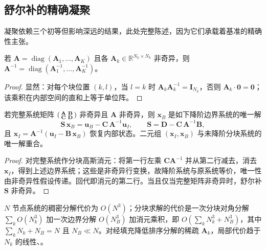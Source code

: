 \subsection{舒尔补的精确凝聚}
\label{sub:schur}

凝聚依赖三个初等但影响深远的结果，此处完整陈述，因为它们承载着基准的精确性主张。

\begin{lemma}[分块对角逆]
\label{lem:blockdiag}
若 $\mathbf{A} = \operatorname{diag}(\mathbf{A}_1, \dots, \mathbf{A}_K)$ 且各 $\mathbf{A}_k \in \mathbb{R}^{N_k \times N_k}$ 非奇异，则 $\mathbf{A}^{-1} = \operatorname{diag}(\mathbf{A}_1^{-1}, \dots, \mathbf{A}_K^{-1})$。
\end{lemma}
\begin{proof}
显然：对每个块位置 $(k, l)$，当 $l = k$ 时 $\mathbf{A}_k \mathbf{A}_k^{-1} = \mathbf{I}_{N_k}$，否则 $\mathbf{A}_k \cdot \mathbf{0} = \mathbf{0}$；该乘积在内部空间的直和上等于单位阵。
\end{proof}

\begin{theorem}[舒尔凝聚的精确性]
\label{thm:schur}
若完整系统矩阵 $\begin{psmallmatrix} \mathbf{A} & \mathbf{B} \\ \mathbf{C} & \mathbf{D} \end{psmallmatrix}$ 非奇异且 $\mathbf{A}$ 非奇异，则 $\mathbf{x}_B$ 是如下降阶边界系统的唯一解
\begin{equation}
\mathbf{S}\, \mathbf{x}_B = \mathbf{u}_B - \mathbf{C}\, \mathbf{A}^{-1} \mathbf{u}_I, \qquad \mathbf{S} = \mathbf{D} - \mathbf{C}\, \mathbf{A}^{-1} \mathbf{B},
\label{eq:schur}
\end{equation}
且 $\mathbf{x}_I = \mathbf{A}^{-1}(\mathbf{u}_I - \mathbf{B}\, \mathbf{x}_B)$ 恢复内部状态。二元组 $(\mathbf{x}_I, \mathbf{x}_B)$ 与未降阶分块系统的唯一解重合。
\end{theorem}
\begin{proof}
对完整系统作分块高斯消元：将第一行左乘 $\mathbf{C}\mathbf{A}^{-1}$ 并从第二行减去，消去 $\mathbf{x}_I$，得到上述边界系统；这些是非奇异行变换，故降阶系统与原系统等价，唯一性由非奇异性假设传递。回代即消元的第二行。当且仅当完整矩阵非奇异时，舒尔补 $\mathbf{S}$ 非奇异\cite{zhang2005}。
\end{proof}

\begin{proposition}[复杂度]
\label{prop:complexity}
$N$ 节点系统的稠密分解代价为 $O(N^3)$；分块求解的代价是一次分块对角分解 $\sum_k O(N_k^3)$ 加一次边界分解 $O(N_B^3)$ 加消元乘积，即 $O\!\left(\sum_k N_k^3 + N_B^3\right)$，其中 $\sum_k N_k + N_B = N$ 且 $N_B \ll N$。对经填充降低排序分解的稀疏 $\mathbf{A}_k$，局部代价趋于 $N_k$ 的线性\cite{george1973}、\cite{saad2003}。
\end{proposition}

